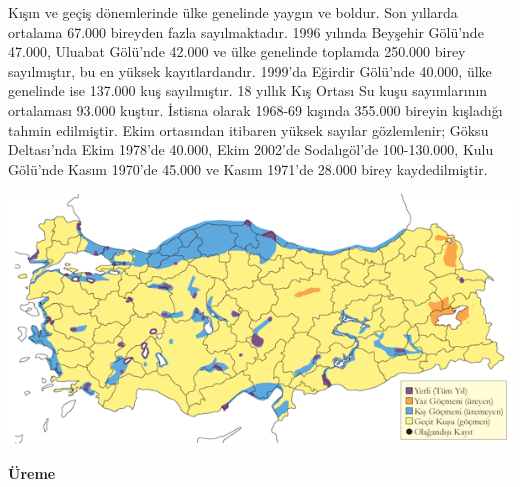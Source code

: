 \documentclass[
  letterpaper,
  DIV=11,
  numbers=noendperiod]{scrreprt}
\begin{document}
Kışın ve geçiş dönemlerinde ülke genelinde yaygın ve boldur. Son
yıllarda ortalama 67.000 bireyden fazla sayılmaktadır. 1996 yılında
Beyşehir Gölü'nde 47.000, Uluabat Gölü'nde 42.000 ve ülke genelinde
toplamda 250.000 birey sayılmıştır, bu en yüksek kayıtlardandır. 1999'da
Eğirdir Gölü'nde 40.000, ülke genelinde ise 137.000 kuş sayılmıştır. 18
yıllık Kış Ortası Su kuşu sayımlarının ortalaması 93.000 kuştur. İstisna
olarak 1968-69 kışında 355.000 bireyin kışladığı tahmin edilmiştir. Ekim
ortasından itibaren yüksek sayılar gözlemlenir; Göksu Deltası'nda Ekim
1978'de 40.000, Ekim 2002'de Sodalıgöl'de 100-130.000, Kulu Gölü'nde
Kasım 1970'de 45.000 ve Kasım 1971'de 28.000 birey kaydedilmiştir.

\includegraphics{images/harita_Page_023.png}

\textbf{Üreme}
\end{document}
